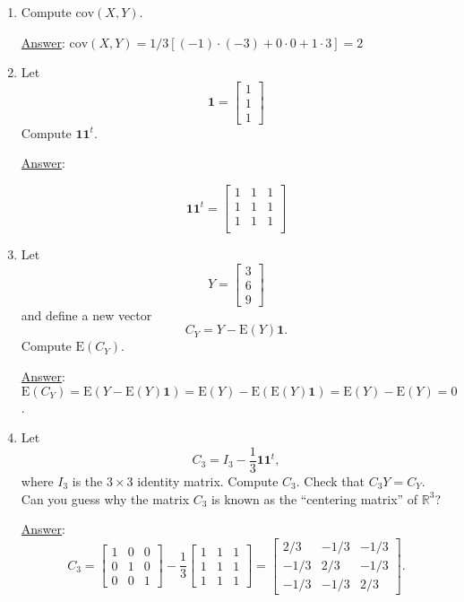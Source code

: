 \documentclass[]{book}
\theoremstyle{definition}
\newcommand{\bb}[1]{\mathbb{#1}}
\newcommand{\R}{\bb{R}}
\newcommand\ans{\underline{Answer}: }
\begin{document}
\begin{enumerate}
\begin{enumerate}
\item Compute $\textrm{cov}(X, Y)$.

\ans $\textrm{cov}(X, Y) = 1/3 \left[(-1) \cdot (-3) + 0\cdot 0 + 1\cdot 3\right]= 2$ 

\item Let
\[
\textbf{1}=\left[
{\begin{array}{c}
   1 \\
   1 \\
   1
\end{array} } \right]
\]
Compute $\textbf{1}\textbf{1}^t$.

\ans 

\[ 
\textbf{1}\textbf{1}^t=
  \begin{bmatrix}
  1 & 1 & 1 \\
  1 & 1 & 1 \\
  1 & 1 & 1 \\  
  \end{bmatrix}
\]

\item
Let
\[
Y=\left[
{\begin{array}{c}
   3 \\
   6 \\
   9
\end{array} } \right]
\]
and define a new vector
\[
C_Y= Y - \textrm{E}(Y)\textbf{1}.
\]
Compute $\textrm{E}(C_Y)$.

\ans $\textrm{E}(C_Y) = \textrm{E}(Y - \textrm{E}(Y)\textbf{1}) = \textrm{E}(Y) - \textrm{E}(\textrm{E}(Y)\textbf{1}) = \textrm{E}(Y) - \textrm{E}(Y) = 0$.

\item Let
\[
C_3 = I_3 - \frac{1}{3}\textbf{1}\textbf{1}^t,
\]
where $I_3$ is the $3\times 3$ identity matrix. Compute $C_3$. Check that $C_3 Y = C_Y$. Can you guess why the matrix $C_3$ is known 
as the ``centering matrix'' of $\R^3$?

\ans
\[
C_3 = 
\begin{bmatrix}
  1 & 0 & 0 \\
  0 & 1 & 0 \\
  0 & 0 & 1   
  \end{bmatrix}
- \frac{1}{3}
\begin{bmatrix}
  1 & 1 & 1 \\
  1 & 1 & 1 \\
  1 & 1 & 1   
  \end{bmatrix} =
\begin{bmatrix}
  2/3 & -1/3 & -1/3 \\
  -1/3 & 2/3 & -1/3 \\
  -1/3 & -1/3 & 2/3   
  \end{bmatrix}.
\]


\end{enumerate}
\end{enumerate}
\end{document}
